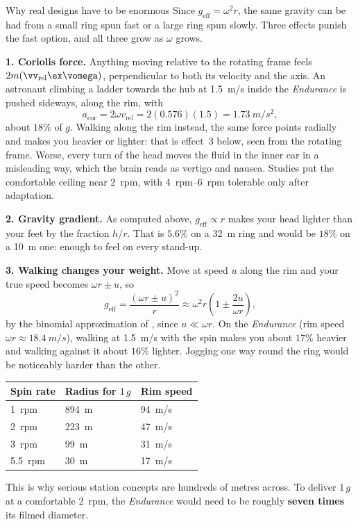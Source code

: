 \begin{remarkbox}{Why real designs have to be enormous}
Since $g_{\text{eff}}=\omega^{2}r$, the same gravity can be had from a small ring spun fast or a large
ring spun slowly. Three effects punish the fast option, and all three grow as $\omega$ grows.

\medskip
\textbf{1. Coriolis force.} Anything moving relative to the rotating frame feels
$2m(\vv_{\text{rel}}\ex\vomega)$, perpendicular to both its velocity and the axis. An astronaut
climbing a ladder towards the hub at \SI{1.5}{m/s} inside the \emph{Endurance} is pushed sideways,
along the rim, with
\[
a_{\text{cor}}=2\omega v_{\text{rel}}=2(0.576)(1.5)=\SI{1.73}{m/s^2},
\]
about $18\%$ of $g$. Walking along the rim instead, the same force points radially and makes you
heavier or lighter: that is effect~3 below, seen from the rotating frame. Worse, every turn of the head
moves the fluid in the inner
ear in a misleading way, which the brain reads as vertigo and nausea. Studies put the comfortable
ceiling near \SI{2}{rpm}, with \SIrange{4}{6}{rpm} tolerable only after adaptation.

\medskip
\textbf{2. Gravity gradient.} As computed above, $g_{\text{eff}}\propto r$ makes your head lighter than
your feet by the fraction $h/r$. That is $5.6\%$ on a \SI{32}{m} ring and would be $18\%$ on a
\SI{10}{m} one: enough to feel on every stand-up.

\medskip
\textbf{3. Walking changes your weight.} Move at speed $u$ along the rim and your true speed becomes
$\omega r\pm u$, so
\[
g_{\text{eff}}=\frac{(\omega r\pm u)^{2}}{r}\approx\omega^{2}r\left(1\pm\frac{2u}{\omega r}\right),
\]
by the binomial approximation of , since $u\ll\omega r$.
On the \emph{Endurance} (rim speed $\omega r\approx\SI{18.4}{m/s}$), walking at \SI{1.5}{m/s} with
the spin makes you about $17\%$ heavier and walking against it about $16\%$ lighter. Jogging one way
round the ring would be noticeably harder than the other.

\medskip
\begin{center}
\begin{tabular}{@{}lll@{}}
\toprule
Spin rate & Radius for $1\,g$ & Rim speed\\
\midrule
\SI{1}{rpm}   & \SI{894}{m} & \SI{94}{m/s}\\
\SI{2}{rpm}   & \SI{223}{m} & \SI{47}{m/s}\\
\SI{3}{rpm}   & \SI{99}{m}  & \SI{31}{m/s}\\
\SI{5.5}{rpm} & \SI{30}{m}  & \SI{17}{m/s}\\
\bottomrule
\end{tabular}
\end{center}

\medskip
This is why serious station concepts are hundreds of metres across. To deliver $1\,g$ at a
comfortable \SI{2}{rpm}, the \emph{Endurance} would need to be roughly \textbf{seven times} its filmed
diameter.
\end{remarkbox}

